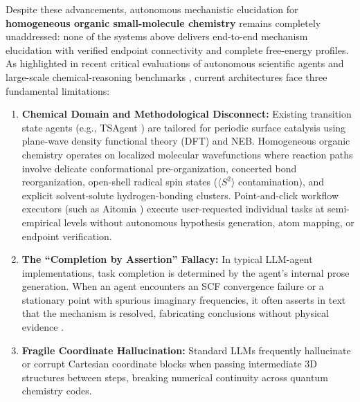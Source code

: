 \documentclass[10pt,twocolumn,letterpaper]{article}
\begin{document}
Despite these advancements, autonomous mechanistic elucidation for \textbf{homogeneous organic small-molecule chemistry} remains completely unaddressed: none of the systems above delivers end-to-end mechanism elucidation with verified endpoint connectivity and complete free-energy profiles. As highlighted in recent critical evaluations of autonomous scientific agents \cite{canai2026,yik2024chatgpt} and large-scale chemical-reasoning benchmarks \cite{mirza2025chembench}, current architectures face three fundamental limitations:
\begin{enumerate}[leftmargin=*]
\item \textbf{Chemical Domain and Methodological Disconnect:} Existing transition state agents (e.g., TSAgent \cite{tsagent2026}) are tailored for periodic surface catalysis using plane-wave density functional theory (DFT) and NEB. Homogeneous organic chemistry operates on localized molecular wavefunctions where reaction paths involve delicate conformational pre-organization, concerted bond reorganization, open-shell radical spin states ($\langle S^2 \rangle$ contamination), and explicit solvent-solute hydrogen-bonding clusters. Point-and-click workflow executors (such as Aitomia \cite{aitomia2026}) execute user-requested individual tasks at semi-empirical levels without autonomous hypothesis generation, atom mapping, or endpoint verification.
\item \textbf{The ``Completion by Assertion'' Fallacy:} In typical LLM-agent implementations, task completion is determined by the agent's internal prose generation. When an agent encounters an SCF convergence failure or a stationary point with spurious imaginary frequencies, it often asserts in text that the mechanism is resolved, fabricating conclusions without physical evidence \cite{yik2024chatgpt,canai2026}.
\item \textbf{Fragile Coordinate Hallucination:} Standard LLMs frequently hallucinate or corrupt Cartesian coordinate blocks when passing intermediate 3D structures between steps, breaking numerical continuity across quantum chemistry codes.
\end{enumerate}
\end{document}

